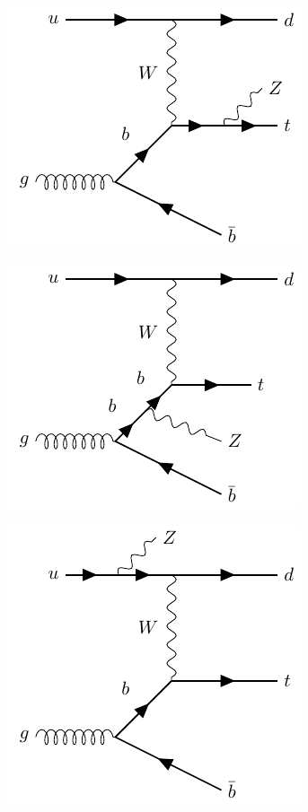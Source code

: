 \begin{figure}[h!] 
  \begin{subfigure}[b]{0.33\linewidth}
    \centering
    \includegraphics[width=0.7\linewidth]{ubonn-thesis/Chapters/Chapters_02/Figure/tZq_Zfromtop.pdf} 
  \caption{}
  \label{topcoup}
  \end{subfigure}%
  \begin{subfigure}[b]{0.33\linewidth}
    \centering
    \includegraphics[width=0.7\linewidth]{ubonn-thesis/Chapters/Chapters_02/Figure/tZq_Zfromb.pdf} 
  \caption{}
  \end{subfigure} 
  \begin{subfigure}[b]{0.33\linewidth}
    \centering
    \includegraphics[width=0.7\linewidth]{ubonn-thesis/Chapters/Chapters_02/Figure/tZq_Zfromu.pdf} 

\end{subfigure}
\end{figure}
